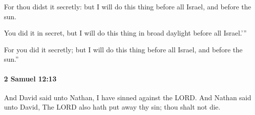 			\begin{versebox}
					\item[BHS] 
					\item[ASV] For thou didst it secretly: but I will do this thing before all Israel, and before the sun.
					\item[NIV] You did it in secret, but I will do this thing in broad daylight before all Israel.’”
					\item[NRSV] For you did it secretly; but I will do this thing before all Israel, and before the sun.”
			\end{versebox}

		\paragraph{2 Samuel 12:13} %
			\label{2SAMUEL-12-13}

			And David said unto Nathan, I have sinned against the LORD. And Nathan said unto David, The LORD also hath put away thy sin; thou shalt not die.

